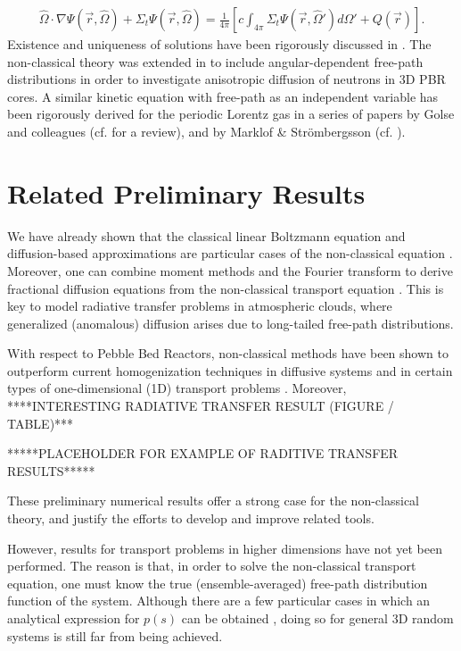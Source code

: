 \documentclass[12pt]{article}
\newcommand{\rvec}{\ensuremath{\vec{r}}}
\newcommand{\omvec}{\ensuremath{\hat{\Omega}}}
\begin{document}
\begin{align}\label{eq5}
\omvec\cdot\nabla\Psi(\rvec,\omvec) + \Sigma_t\Psi(\rvec,\omvec)
= \frac{1}{4\pi}\left[c\int_{4\pi} \Sigma_t\Psi(\rvec,\omvec')d\Omega' + Q(\rvec)\right].\nonumber
\end{align}
Existence and uniqueness of solutions have been rigorously discussed in \cite{fragou10}.
The non-classical theory was extended in \cite{vaslar14a} to include angular-dependent free-path distributions in order to investigate anisotropic diffusion of neutrons in 3D PBR cores.
A similar kinetic equation with free-path as an independent variable has been rigorously derived for the periodic Lorentz gas in a series of papers by Golse and colleagues (cf. \cite{gol12} for a review), and by Marklof \& Str\"ombergsson (cf. \cite{marstr11,marstr15}). 

\section{Related Preliminary Results}

We have already shown that the classical linear Boltzmann equation and diffusion-based approximations are particular cases of the non-classical equation \cite{frakry15,vas16}.
Moreover, one can combine moment methods and the Fourier transform to derive fractional diffusion equations from the non-classical transport equation \cite{frasun16}.
This is key to model radiative transfer problems in atmospheric clouds, where generalized (anomalous) diffusion arises due to long-tailed free-path distributions. 

With respect to Pebble Bed Reactors, non-classical methods have been shown to outperform current homogenization techniques in diffusive systems \cite{larvas11,vaslar14b,vas13} and in certain types of one-dimensional (1D) transport problems \cite{vaskry16}.   
Moreover, ****INTERESTING RADIATIVE TRANSFER RESULT (FIGURE / TABLE)***
\begin{center}
*****PLACEHOLDER FOR EXAMPLE OF RADITIVE TRANSFER RESULTS*****
\end{center} 
These preliminary numerical results offer a strong case for the non-classical theory, and justify the efforts to develop and improve related tools.

However, results for transport problems in higher dimensions have not yet been performed. The reason is that, in order to solve the non-classical transport equation, one must know the true (ensemble-averaged) free-path distribution function of the system.
Although there are a few particular cases in which an analytical expression for $p(s)$ can be obtained \cite{vaskry16,vassla16}, doing so for general 3D random systems is still far from being achieved.   
\end{document}

